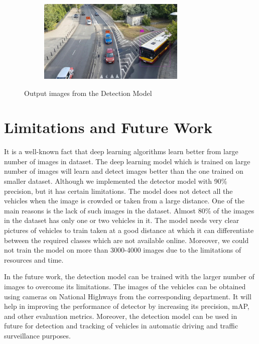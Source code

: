 \begin{figure}
    \quad
    \begin{subfigure}[t]{0.475\textwidth}   
        \centering 
        \includegraphics[width = 7cm, height = 5 cm]{CHAPTERS/Chapter-5/images/5.12d.jpg}
        \caption[]%
        {{\small }}    
        \label{fig:mean and std of net44}
    \end{subfigure}
    \caption[ ]
    {\small Output images from the Detection Model}
    \label{fig:5.12}
\end{figure}
\section{Limitations and Future Work}
It is a well-known fact that deep learning algorithms learn better from large number of images in dataset. The deep learning model which is trained on large number of images will learn and detect images better than the one trained on smaller dataset. Although we implemented the detector model with 90\% precision, but it has certain limitations. The model does not detect all the vehicles when the image is crowded or taken from a large distance. One of the main reasons is the lack of such images in the dataset. Almost 80\% of the images in the dataset has only one or two vehicles in it. The model needs very clear pictures of vehicles to train taken at a good distance at which it can differentiate between the required classes which are not available online. Moreover, we could not train the model on more than 3000-4000 images due to the limitations of resources and time. 

In the future work, the detection model can be trained with the larger number of images to overcome its limitations. The images of the vehicles can be obtained using cameras on National Highways from the corresponding department. It will help in improving the performance of detector by increasing its precision, mAP, and other evaluation metrics. Moreover, the detection model can be used in future for detection and tracking of vehicles in automatic driving and traffic surveillance purposes.
